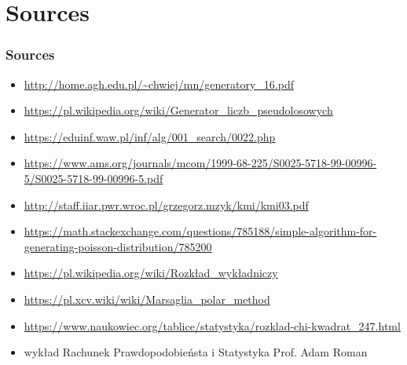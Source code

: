 \documentclass[9pt]{beamer}
\begin{document}
\section{Sources}
\begin{frame}
  \frametitle{Sources}
  \begin{itemize}
    \item \url{http://home.agh.edu.pl/~chwiej/mn/generatory_16.pdf}
    \item \url{https://pl.wikipedia.org/wiki/Generator_liczb_pseudolosowych}
    \item \url{https://eduinf.waw.pl/inf/alg/001_search/0022.php}
    \item \url{https://www.ams.org/journals/mcom/1999-68-225/S0025-5718-99-00996-5/S0025-5718-99-00996-5.pdf}
    \item \url{http://staff.iiar.pwr.wroc.pl/grzegorz.mzyk/kmi/kmi03.pdf}
    \item \url{https://math.stackexchange.com/questions/785188/simple-algorithm-for-generating-poisson-distribution/785200}
    \item \url{https://pl.wikipedia.org/wiki/Rozkład_wykładniczy}
    \item \url{https://pl.xcv.wiki/wiki/Marsaglia_polar_method}
    \item \url{https://www.naukowiec.org/tablice/statystyka/rozklad-chi-kwadrat_247.html}
    \item wykład Rachunek Prawdopodobieństa i Statystyka Prof. Adam Roman
  \end{itemize}
\end{frame}
\end{document}
